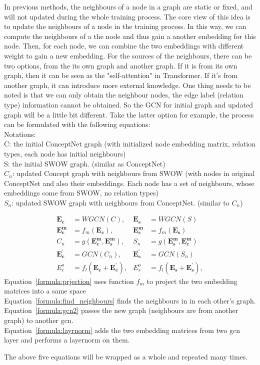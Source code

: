In previous methods, the neighbours of a node in a graph are static or fixed, and will not updated during the whole training process. The core view of this idea is to update the neighbours of a node in the training process. In this way, we can compute the neighbours of a the node and thus gain a another embedding for this node. Then, for each node, we can combine the two embeddings with different weight to gain a new embedding.  For the sources of the neighbours, there can be two options, from the its own graph and another graph. If it is from its own graph, then it can be seen as the "self-attention" in Transformer. 
If it's from another graph, it can introduce more external knowledge. 
One thing needs to be noted is that we can only obtain the neighbour nodes, the edge label (relation type) information cannot be obtained. So the GCN for initial graph and updated graph will be a little bit different. Take the latter option for example, the process can be formulated with the following equations: \\

\noindent Notations: \\ 
C: the initial ConceptNet graph  (with initialized node embedding matrix, relation types, each node has initial neighbours)\\
S: the initial SWOW graph.  (similar as ConceptNet)
\\$C_n$: updated Concept graph with neighbours from SWOW (with nodes in original ConceptNet and also their embeddings. Each node has a set of neighbours, whose embeddings come from SWOW, no relation types) \\ 
$S_n$: updated SWOW graph with neighbours from ConceptNet. (similar to $C_n$)

\begin{align}
\mathbf{E_{c} } & = WGCN(C),  & \mathbf{E_{s}}  & = WGCN(S) \label{formula:gcn}\\
 \mathbf{E_{c}^m} & = f_m(\mathbf{E_c}), &  \mathbf{E_{s}^m} & =f_m(\mathbf{E_s}) \label{formula:prjection} \\
C_n  &= g(\mathbf{E_{c}^m}, \mathbf{E_{s}^m}),  & S_n  & = g(\mathbf{E_{s}^m}, \mathbf{E_{c}^m})   \label{formula:find_neighbours} \\
    \mathbf{E_c^{\prime}}& = GCN(C_n),   & \mathbf{E_s^{\prime}} & =GCN(S_n) \label{formula:gcn2} \\
    E_c^o  &= f_l(\mathbf{E_c } + \mathbf{E_c^{\prime}}), & E_s^o & = f_l(\mathbf{E_s } + \mathbf{E_s^{\prime}}),  \label{formula:layrnorm}
\end{align}
Equation~\ref{formula:prjection} uses function $f_m$ to project the two embedding matrices into a same space\\
Equation~\ref{formula:find_neighbours}  finds the neighbours in in each other's graph.\\
Equation~\ref{formula:gcn2} passes the new graph (neighbours are from another graph) to another gcn.\\
Equation~\ref{formula:layrnorm} adds the two embedding matrices from two gcn layer and performs a layernorm on them.


The above five equations will be wrapped as a whole and repeated many times. 



%

%


